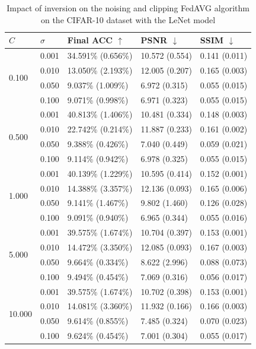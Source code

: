 \documentclass[conference,compsoc]{IEEEtran}
\begin{document}
\begin{table}[H]
\centering
\caption{Impact of inversion on the noising and clipping FedAVG algorithm on the CIFAR-10 dataset with the LeNet model}
\label{table:dp_cifar10_lenet}
\begin{tabular}{lllll}
\hline
$C$ & $\sigma$ & \textbf{Final ACC} $\uparrow$ & \textbf{PSNR} $\downarrow$ & \textbf{SSIM} $\downarrow$ \\
\hline
\multirow{4}{*}{0.100} & 0.001 & 34.591\% (0.656\%) & 10.572 (0.554) & 0.141 (0.011) \\
& 0.010 & 13.050\% (2.193\%) & 12.005 (0.207) & 0.165 (0.003) \\
& 0.050 & 9.037\% (1.009\%) & 6.972 (0.315) & 0.055 (0.015) \\
& 0.100 & 9.071\% (0.998\%) & 6.971 (0.323) & 0.055 (0.015) \\
\hline
\multirow{4}{*}{0.500} & 0.001 & 40.813\% (1.406\%) & 10.481 (0.334) & 0.148 (0.003) \\
& 0.010 & 22.742\% (0.214\%) & 11.887 (0.233) & 0.161 (0.002) \\
& 0.050 & 9.388\% (0.426\%) & 7.040 (0.449) & 0.059 (0.021) \\
& 0.100 & 9.114\% (0.942\%) & 6.978 (0.325) & 0.055 (0.015) \\
\hline
\multirow{4}{*}{1.000} & 0.001 & 40.139\% (1.229\%) & 10.595 (0.414) & 0.152 (0.001) \\
& 0.010 & 14.388\% (3.357\%) & 12.136 (0.093) & 0.165 (0.006) \\
& 0.050 & 9.141\% (1.467\%) & 9.802 (1.460) & 0.126 (0.028) \\
& 0.100 & 9.091\% (0.940\%) & 6.965 (0.344) & 0.055 (0.016) \\
\hline
\multirow{4}{*}{5.000} & 0.001 & 39.575\% (1.674\%) & 10.704 (0.397) & 0.153 (0.001) \\
& 0.010 & 14.472\% (3.350\%) & 12.085 (0.093) & 0.167 (0.003) \\
& 0.050 & 9.664\% (0.334\%) & 8.622 (2.996) & 0.088 (0.073) \\
& 0.100 & 9.494\% (0.454\%) & 7.069 (0.316) & 0.056 (0.017) \\
\hline
\multirow{4}{*}{10.000} & 0.001 & 39.575\% (1.674\%) & 10.702 (0.398) & 0.153 (0.001) \\
& 0.010 & 14.081\% (3.360\%) & 11.932 (0.166) & 0.166 (0.003) \\
& 0.050 & 9.614\% (0.855\%) & 7.485 (0.324) & 0.070 (0.023) \\
& 0.100 & 9.624\% (0.454\%) & 7.001 (0.304) & 0.055 (0.017) \\
\hline
\end{tabular}
\end{table}
\end{document}
